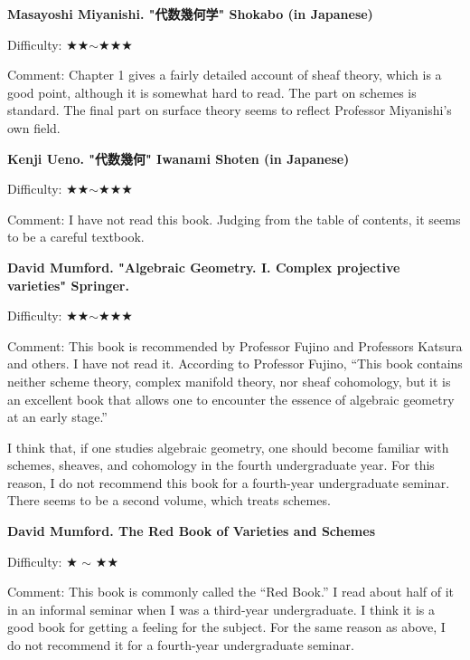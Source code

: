 \textbf{Masayoshi Miyanishi. "代数幾何学" Shokabo (in Japanese)}  \vspace{-6pt}

Difficulty: ★★$\sim$★★★  \vspace{-6pt}
 
Comment: Chapter 1 gives a fairly detailed account of sheaf theory, which is a good point, although it is somewhat hard to read. The part on schemes is standard. The final part on surface theory seems to reflect Professor Miyanishi's own field. 
\vspace{8pt}

\textbf{Kenji Ueno. "代数幾何" Iwanami Shoten (in Japanese)}\vspace{-6pt}

Difficulty: ★★$\sim$★★★  \vspace{-6pt}

Comment: I have not read this book. Judging from the table of contents, it seems to be a careful textbook.
\vspace{8pt}

\textbf{David Mumford. "Algebraic Geometry. I. Complex projective varieties" Springer.}\vspace{-6pt}

Difficulty: ★★$\sim$★★★  \vspace{-6pt}

Comment: This book is recommended by Professor Fujino and Professors Katsura and others. I have not read it. According to Professor Fujino, ``This book contains neither scheme theory, complex manifold theory, nor sheaf cohomology, but it is an excellent book that allows one to encounter the essence of algebraic geometry at an early stage.''

I think that, if one studies algebraic geometry, one should become familiar with schemes, sheaves, and cohomology in the fourth undergraduate year. For this reason, I do not recommend this book for a fourth-year undergraduate seminar. 
There seems to be a second volume, which treats schemes.
\vspace{8pt}

\textbf{David Mumford. The Red Book of Varieties and Schemes}\vspace{-6pt}

Difficulty: ★ $\sim$ ★★ \vspace{-6pt}

Comment: This book is commonly called the ``Red Book.'' I read about half of it in an informal seminar when I was a third-year undergraduate. I think it is a good book for getting a feeling for the subject. For the same reason as above, I do not recommend it for a fourth-year undergraduate seminar.
\vspace{8pt}

